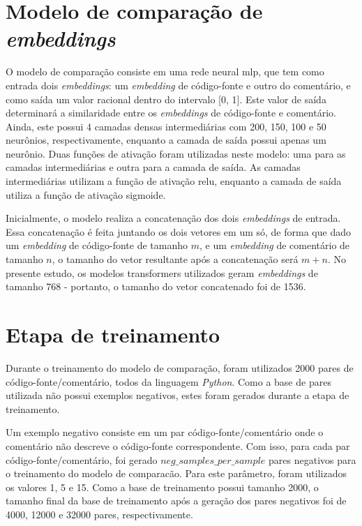 \section{Modelo de comparação de \textit{embeddings}}
\label{sec:methodology:embedding-comparator}

O modelo de comparação consiste em uma rede neural \gls{mlp}, que tem como entrada dois \textit{embeddings}: um \textit{embedding} de código-fonte e outro do comentário, e como saída um valor racional dentro do intervalo [0, 1]. Este valor de saída determinará a similaridade entre os \textit{embeddings} de código-fonte e comentário. Ainda, este possui 4 camadas densas intermediárias com 200, 150, 100 e 50 neurônios, respectivamente, enquanto a camada de saída possui apenas um neurônio. Duas funções de ativação foram utilizadas neste modelo: uma para as camadas intermediárias e outra para a camada de saída. As camadas intermediárias utilizam a função de ativação \gls{relu}, enquanto a camada de saída utiliza a função de ativação sigmoide.

Inicialmente, o modelo realiza a concatenação dos dois \textit{embeddings} de entrada. Essa concatenação é feita juntando os dois vetores em um só, de forma que dado um \textit{embedding} de código-fonte de tamanho $m$, e um \textit{embedding} de comentário de tamanho $n$, o tamanho do vetor resultante após a concatenação será $m + n$. No presente estudo, os modelos transformers utilizados geram \textit{embeddings} de tamanho 768 - portanto, o tamanho do vetor concatenado foi de 1536.

\section{Etapa de treinamento}
\label{sec:methodology:embedding-comparator-training}
Durante o treinamento do modelo de comparação, foram utilizados 2000 pares de código-fonte/comentário, todos da linguagem \textit{Python}. Como a base de pares utilizada não possui exemplos negativos, estes foram gerados durante a etapa de treinamento.

Um exemplo negativo consiste em um par código-fonte/comentário onde o comentário não descreve o código-fonte correspondente. Com isso, para cada par código-fonte/comentário, foi gerado $neg\_samples\_per\_sample$ pares negativos para o treinamento do modelo de comparacão. Para este parâmetro, foram utilizados os valores 1, 5 e 15. Como a base de treinamento possui tamanho 2000, o tamanho final da base de treinamento após a geração dos pares negativos foi de 4000, 12000 e 32000 pares, respectivamente.

